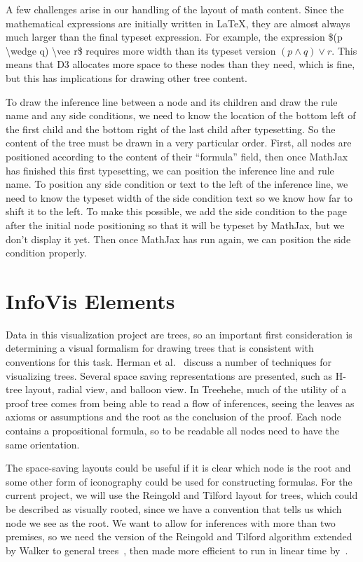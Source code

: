 \documentclass[journal]{vgtc}                %
\newcommand{\projectname}{Treehehe}
\begin{document}
A few challenges arise in our handling of the layout of math content. Since the mathematical expressions are initially written in \LaTeX{}, they are almost always much larger than the final typeset expression. For example, the expression \$(p \textbackslash wedge q) \textbackslash vee r\$ requires more width than its typeset version $(p \wedge q) \vee r$. This means that D3 allocates more space to these nodes than they need, which is fine, but this has implications for drawing other tree content.

To draw the inference line between a node and its children and draw the rule name and any side conditions, we need to know the location of the bottom left of the first child and the bottom right of the last child after typesetting. So the content of the tree must be drawn in a very particular order. First, all nodes are positioned according to the content of their ``formula'' field, then once MathJax has finished this first typesetting, we can position the inference line and rule name. To position any side condition or text to the left of the inference line, we need to know the typeset width of the side condition text so we know how far to shift it to the left. To make this possible, we add the side condition to the page after the initial node positioning so that it will be typeset by MathJax, but we don't display it yet. Then once MathJax has run again, we can position the side condition properly.


\section{InfoVis Elements}
\label{sec:infoviselem}

Data in this visualization project are trees, so an important first consideration is determining a visual formalism for drawing trees that is consistent with conventions for this task. Herman et al.~\cite{graphvis-herman+melancon+marshall} discuss a number of techniques for visualizing trees. Several space saving representations are presented, such as H-tree layout, radial view, and balloon view. In \projectname{}, much of the utility of a proof tree comes from being able to read a flow of inferences, seeing the leaves as axioms or assumptions and the root as the conclusion of the proof. Each node contains a propositional formula, so to be readable all nodes need to have the same orientation.

The space-saving layouts could be useful if it is clear which node is the root and some other form of iconography could be used for constructing formulas. For the current project, we will use the Reingold and Tilford layout for trees, which could be described as visually rooted, since we have a convention that tells us which node we see as the root. We want to allow for inferences with more than two premises, so we need the version of the Reingold and Tilford algorithm extended by Walker to general trees~\cite{generaltreeslayout-walker}, then made more efficient to run in linear time by~\cite{improvingwalker-buchheim+etal}.
\end{document}
